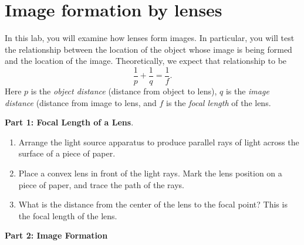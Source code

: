 \section{Image formation by lenses}

\makelabheader

In this lab, you will examine how lenses form images.  In particular,
you will test the relationship between the location of the object
whose image is being formed and the location of the image.  Theoretically,
we expect that relationship to be
$$
\frac{1}{p} + \frac{1}{q} = \frac{1}{f}.
$$
Here $p$ is the \textit{object distance} (distance from object to lens),
$q$ is the \textit{image distance} (distance from image to lens, and $f$
is the \textit{focal length} of the lens.

\bigskip

{\bf Part 1: Focal Length of a Lens}.

\begin{enumerate}

\item Arrange the light source apparatus to produce parallel
rays of light across the surface of a piece of paper.
\item Place a convex lens in front of the
light rays.  Mark the lens position on a piece of paper, and trace
the path of the rays.
\item What is the distance from the center of the lens to the focal
point?  This is the focal length of the lens.

\answerspace{1in}

\end{enumerate}

\bigskip

{\bf Part 2: Image Formation}

